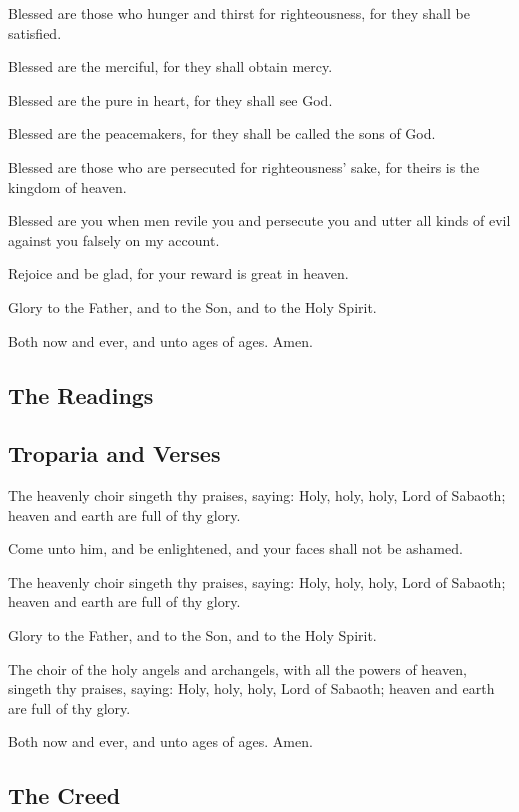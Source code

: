 Blessed are those who hunger and thirst for righteousness, for they shall be satisfied.

Blessed are the merciful, for they shall obtain mercy.

Blessed are the pure in heart, for they shall see God.

Blessed are the peacemakers, for they shall be called the sons of God.

Blessed are those who are persecuted for righteousness' sake, for theirs is the kingdom of heaven.

Blessed are you when men revile you and persecute you and utter all kinds of evil against you falsely on my account.

Rejoice and be glad, for your reward is great in heaven.

Glory to the Father, and to the Son, and to the Holy Spirit.

Both now and ever, and unto ages of ages. Amen.

\subsection{The Readings}


\subsection{Troparia and Verses}

The heavenly choir singeth thy praises, saying: Holy, holy, holy, Lord of Sabaoth; heaven and earth are full of thy glory.

Come unto him, and be enlightened, and your faces shall not be ashamed.

The heavenly choir singeth thy praises, saying: Holy, holy, holy, Lord of Sabaoth; heaven and earth are full of thy glory.

Glory to the Father, and to the Son, and to the Holy Spirit.

The choir of the holy angels and archangels, with all the powers of heaven, singeth thy praises, saying: Holy, holy, holy, Lord of Sabaoth; heaven and earth are full of thy glory.

Both now and ever, and unto ages of ages. Amen.

\subsection{The Creed}

